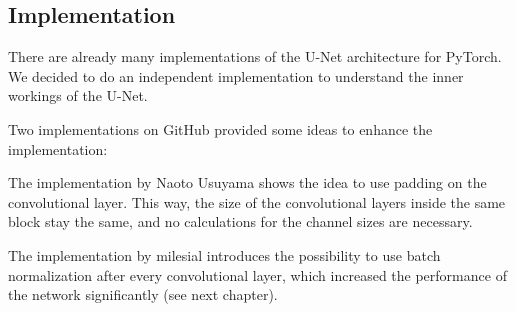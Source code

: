 \subsection{Implementation}
There are already many implementations of the U-Net architecture for PyTorch. We decided to do an independent implementation
to understand the inner workings of the U-Net.

Two implementations on GitHub provided some ideas to enhance the implementation:

The implementation by Naoto Usuyama \cite{unetmilesial} shows the idea to use padding on the convolutional layer. This way, the size of the convolutional layers inside the same block stay the same, and no calculations for the channel sizes are necessary.

The implementation by milesial \cite{unetmilesial} introduces the possibility to use batch normalization after every convolutional layer, which increased the performance
of the network significantly (see next chapter).

